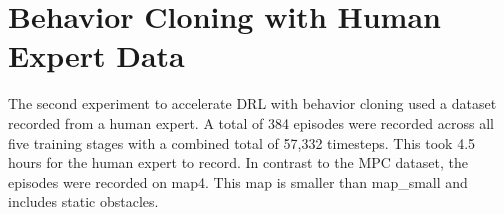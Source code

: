 \section{Behavior Cloning with Human Expert Data}
The second experiment to accelerate DRL with behavior cloning used a dataset recorded from a human expert. A total of 384 episodes were recorded across all five training stages with a combined total of 57,332 timesteps. This took 4.5 hours for the human expert to record. In contrast to the MPC dataset, the episodes were recorded on map4. This map is smaller than map\_small and includes static obstacles.
